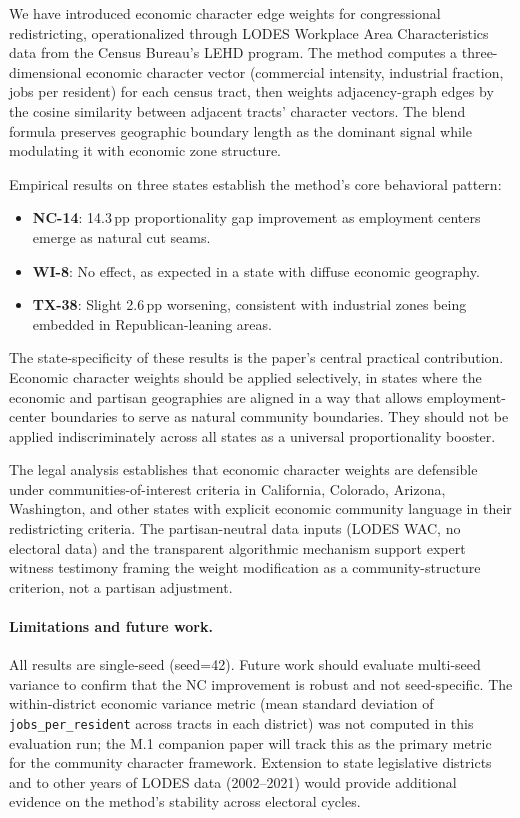\label{sec:conclusion}

We have introduced economic character edge weights for congressional redistricting,
operationalized through LODES Workplace Area Characteristics data from the
Census Bureau's LEHD program.
The method computes a three-dimensional economic character vector
(commercial intensity, industrial fraction, jobs per resident) for each
census tract, then weights adjacency-graph edges by the cosine similarity
between adjacent tracts' character vectors.
The blend formula preserves geographic boundary length as the dominant signal
while modulating it with economic zone structure.

Empirical results on three states establish the method's core behavioral pattern:
\begin{itemize}
  \item \textbf{NC-14}: 14.3\,pp proportionality gap improvement as employment
    centers emerge as natural cut seams.
  \item \textbf{WI-8}: No effect, as expected in a state with diffuse economic
    geography.
  \item \textbf{TX-38}: Slight 2.6\,pp worsening, consistent with industrial
    zones being embedded in Republican-leaning areas.
\end{itemize}

The state-specificity of these results is the paper's central practical
contribution.
Economic character weights should be applied selectively, in states where
the economic and partisan geographies are aligned in a way that allows
employment-center boundaries to serve as natural community boundaries.
They should not be applied indiscriminately across all states as a universal
proportionality booster.

The legal analysis establishes that economic character weights are defensible
under communities-of-interest criteria in California, Colorado, Arizona,
Washington, and other states with explicit economic community language
in their redistricting criteria.
The partisan-neutral data inputs (LODES WAC, no electoral data) and the
transparent algorithmic mechanism support expert witness testimony framing
the weight modification as a community-structure criterion, not a partisan
adjustment.

\paragraph{Limitations and future work.}
All results are single-seed (seed=42).
Future work should evaluate multi-seed variance to confirm that the NC
improvement is robust and not seed-specific.
The within-district economic variance metric (mean standard deviation of
\texttt{jobs\_per\_resident} across tracts in each district) was not computed
in this evaluation run; the M.1 companion paper will track this as the
primary metric for the community character framework.
Extension to state legislative districts and to other years of LODES data
(2002--2021) would provide additional evidence on the method's stability
across electoral cycles.
